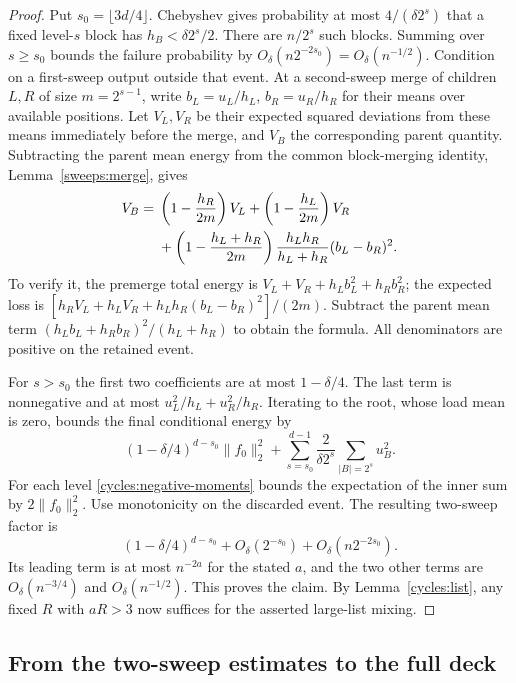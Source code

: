 \begin{proof}
Put $s_0=\lfloor3d/4\rfloor$. Chebyshev gives probability at most
$4/(\delta2^s)$ that a fixed level-$s$ block has
$h_B<\delta2^s/2$. There are $n/2^s$ such blocks. Summing over
$s\ge s_0$ bounds the failure probability by
$O_\delta(n2^{-2s_0})=O_\delta(n^{-1/2})$.
Condition on a first-sweep output outside that event. At a second-sweep
merge of children $L,R$ of size $m=2^{s-1}$, write
$b_L=u_L/h_L$, $b_R=u_R/h_R$ for their means over available positions.
Let $V_L,V_R$ be their expected squared deviations from these means
immediately before the merge, and $V_B$ the corresponding parent
quantity. Subtracting the parent mean energy from the common
block-merging identity, Lemma~\ref{sweeps:merge}, gives
\begin{align}\label{cycles:variance-merge}
 V_B={}&\left(1-\frac{h_R}{2m}\right)V_L+
 \left(1-\frac{h_L}{2m}\right)V_R\notag\\
 &+\left(1-\frac{h_L+h_R}{2m}\right)
       \frac{h_Lh_R}{h_L+h_R}(b_L-b_R)^2.
\end{align}
To verify it, the premerge total energy is
$V_L+V_R+h_Lb_L^2+h_Rb_R^2$; the expected loss is
$[h_RV_L+h_LV_R+h_Lh_R(b_L-b_R)^2]/(2m)$.
Subtract the parent mean term
$(h_Lb_L+h_Rb_R)^2/(h_L+h_R)$ to obtain the formula.
All denominators are positive on the retained event.

For $s>s_0$ the first two coefficients are at most $1-\delta/4$.
The last term is nonnegative and at most
$u_L^2/h_L+u_R^2/h_R$. Iterating to the root, whose load mean is zero,
bounds the final conditional energy by
\[
 (1-\delta/4)^{d-s_0}\|f_0\|_2^2+
 \sum_{s=s_0}^{d-1}\frac{2}{\delta2^s}
                   \sum_{|B|=2^s}u_B^2.
\]
For each level \eqref{cycles:negative-moments} bounds the expectation
of the inner sum by $2\|f_0\|_2^2$. Use monotonicity on the discarded
event. The resulting two-sweep factor is
\begin{equation}\label{cycles:negative-factor}
 (1-\delta/4)^{d-s_0}
       +O_\delta(2^{-s_0})+O_\delta(n2^{-2s_0}).
\end{equation}
Its leading term is at most $n^{-2a}$ for the stated $a$, and the two
other terms are $O_\delta(n^{-3/4})$ and $O_\delta(n^{-1/2})$.
This proves the claim. By Lemma~\ref{cycles:list}, any fixed
$R$ with $aR>3$ now suffices for the asserted large-list mixing.
\end{proof}

\subsection{From the two-sweep estimates to the full deck}
\label{cycles:two-sweep-completion}

